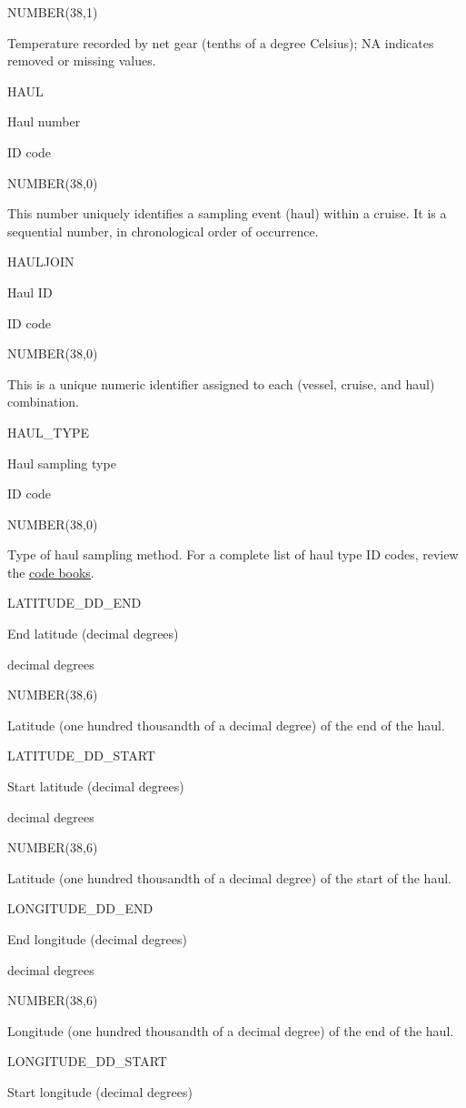\documentclass[
  letterpaper,
  oneside,
  open=any]{scrbook}
\begin{document}
NUMBER(38,1)

Temperature recorded by net gear (tenths of a degree Celsius); NA
indicates removed or missing values.

HAUL

Haul number

ID code

NUMBER(38,0)

This number uniquely identifies a sampling event (haul) within a cruise.
It is a sequential number, in chronological order of occurrence.

HAULJOIN

Haul ID

ID code

NUMBER(38,0)

This is a unique numeric identifier assigned to each (vessel, cruise,
and haul) combination.

HAUL\_TYPE

Haul sampling type

ID code

NUMBER(38,0)

Type of haul sampling method. For a complete list of haul type ID codes,
review the
\href{https://www.fisheries.noaa.gov/resource/document/groundfish-survey-species-code-manual-and-data-codes-manual}{code
books}.

LATITUDE\_DD\_END

End latitude (decimal degrees)

decimal degrees

NUMBER(38,6)

Latitude (one hundred thousandth of a decimal degree) of the end of the
haul.

LATITUDE\_DD\_START

Start latitude (decimal degrees)

decimal degrees

NUMBER(38,6)

Latitude (one hundred thousandth of a decimal degree) of the start of
the haul.

LONGITUDE\_DD\_END

End longitude (decimal degrees)

decimal degrees

NUMBER(38,6)

Longitude (one hundred thousandth of a decimal degree) of the end of the
haul.

LONGITUDE\_DD\_START

Start longitude (decimal degrees)
\end{document}
